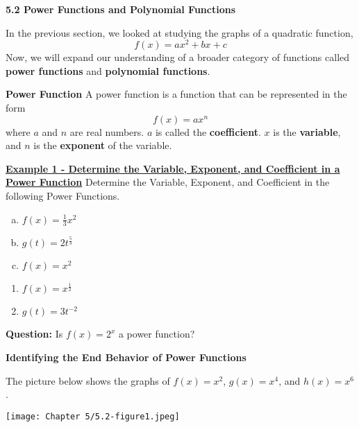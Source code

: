 \documentclass[12pt]{book}
\newcommand{\D}{\displaystyle}
\begin{document}
{\large \textbf{5.2 Power Functions and Polynomial Functions}}

In the previous section, we looked at studying the graphs of a quadratic function,
$$f(x)=ax^2+bx+c$$
Now, we will expand our understanding of a broader category of functions called \textbf{power functions} and \textbf{polynomial functions}. 

\begin{boxR}
\textbf{Power Function}
    \vspace{1mm}
    \hline
    \vspace{2mm}
A power function is a function that can be represented in the form 
    $$ f(x) = ax^n$$
where $a$ and $n$ are real numbers. $a$ is called the \textbf{coefficient}. $x$ is the \textbf{variable}, and $n$ is the \textbf{exponent} of the variable.
\end{boxR}

\underline{\textbf{Example 1 - Determine the Variable, Exponent, and Coefficient in a Power Function}}
Determine the Variable, Exponent, and Coefficient in the following Power Functions. 

\begin{multicols}{3}
\begin{enumerate}[(a)]
    \item $\D f(x)=\frac{1}{3}x^2$
    \item $\D g(t)= 2t^{\frac{5}{3}}$
    \item $\D f(x)=x^2$
\end{enumerate}
\end{multicols}
\vspace{30mm}
\begin{multicols}{3}
\begin{enumerate}[label=(\alph*),start=5]
    \item $\D f(x)=x^{\frac{1}{2}}$
    \item $\D g(t)=3t^{-2}$
\end{enumerate}
\end{multicols}
\vspace{30mm}


\textbf{Question:} Is $\D f(x) = 2^x$ a power function?
\newpage

{\large \textbf{Identifying the End Behavior of Power Functions}}

The picture below shows the graphs of $f(x)=x^2$, $g(x)=x^4$, and $h(x)=x^6$. 

\centerline{\texttt{[image: Chapter 5/5.2-figure1.jpeg]}}
\end{document}
